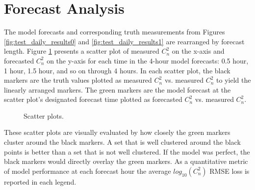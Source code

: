 \section{Forecast Analysis}
The model forecasts and corresponding truth measurements from Figures \ref{fig:test_daily_results0} and \ref{fig:test_daily_results1} are rearranged by forecast length. Figure \ref{fig:test_scatter_results} presents a scatter plot of measured $C_{n}^{2}$ on the x-axis and forecasted $C_{n}^{2}$ on the y-axis for each time in the 4-hour model forecasts: 0.5 hour, 1 hour, 1.5 hour, and so on through 4 hours. In each scatter plot, the black markers are the truth values plotted as measured $C_{n}^{2}$ vs. measured $C_{n}^{2}$ to yield the linearly arranged markers. The green markers are the model forecast at the scatter plot's designated forecast time plotted as forecasted $C_{n}^{2}$ vs. measured $C_{n}^{2}$.
\begin{figure}[p!]
	\centering
	\hfill
	\hfill
	\hfill
	\hfill
	\caption{Scatter plots.}
	\label{fig:test_scatter_results}
\end{figure}
These scatter plots are visually evaluated by how closely the green markers cluster around the black markers. A set that is well clustered around the black points is better than a set that is not well clustered. If the model was perfect, the black markers would directly overlay the green markers. As a quantitative metric of model performance at each forecast hour the average $log_{10}(C_{n}^{2})$ RMSE loss is reported in each legend.

